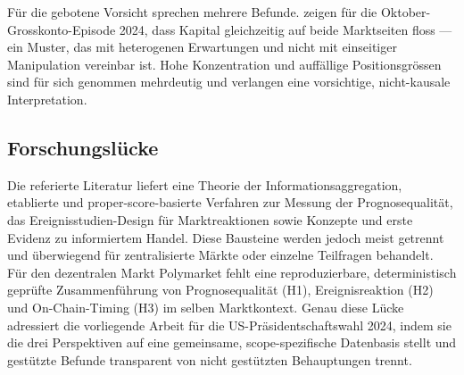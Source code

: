 Für die gebotene Vorsicht sprechen mehrere Befunde. \citet{zotero_poly_001} zeigen
für die Oktober-Grosskonto-Episode 2024, dass Kapital gleichzeitig auf beide
Marktseiten floss --- ein Muster, das mit heterogenen Erwartungen und nicht mit
einseitiger Manipulation vereinbar ist. Hohe Konzentration und auffällige Positionsgrössen sind
für sich genommen mehrdeutig und verlangen eine vorsichtige, nicht-kausale
Interpretation.

\subsection{Forschungslücke}
Die referierte Literatur liefert eine Theorie der Informationsaggregation,
etablierte und proper-score-basierte Verfahren zur Messung der Prognosequalität,
das Ereignisstudien-Design für Marktreaktionen sowie Konzepte und erste Evidenz
zu informiertem Handel. Diese Bausteine werden jedoch meist getrennt und
überwiegend für zentralisierte Märkte oder einzelne Teilfragen behandelt. Für den
dezentralen Markt Polymarket fehlt eine reproduzierbare, deterministisch geprüfte
Zusammenführung von Prognosequalität (H1), Ereignisreaktion (H2) und On-Chain-Timing
(H3) im selben Marktkontext. Genau diese Lücke adressiert die vorliegende Arbeit für
die US-Präsidentschaftswahl 2024, indem sie die drei Perspektiven auf eine
gemeinsame, scope-spezifische Datenbasis stellt und gestützte Befunde transparent
von nicht gestützten Behauptungen trennt.
